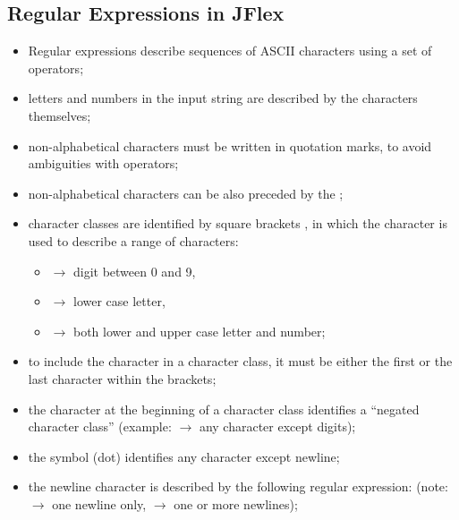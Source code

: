 \subsection{Regular Expressions in JFlex}
\begin{itemize}
    \item Regular expressions describe sequences of ASCII characters using a set of operators;
    \item letters and numbers in the input string are described by the characters themselves;
    \item non-alphabetical characters must be written in quotation marks, to avoid ambiguities with operators;
    \item non-alphabetical characters can be also preceded by the \code{\\};
    \item character classes are identified by square brackets \code{[]}, in which the \code{-} character is used to describe a range of characters:
    \begin{itemize}
        \item \code{[0-9]} $\to$ digit between 0 and 9,
        \item \code{[a-z]} $\to$ lower case letter,
        \item \code{[a-zA-Z0-9]} $\to$ both lower and upper case letter and number;
    \end{itemize}
    \item to include the character \code{-} in a character class, it must be either the first or the last character within the brackets;
    \item the character \code{^} at the beginning of a character class identifies a ``negated character class'' (example: \code{[^0-9]} $\to$ any character except digits);
    \item the symbol  (dot) identifies any character except newline;
    \item the newline character is described by the following regular expression: \code{\\n\|\\r\|\\r\\n} (note: \code{\\n\|\\r\|\\r\\n} $\to$ one newline only, \code{[\\n\\r]+} $\to$ one or more newlines);

\end{itemize}

